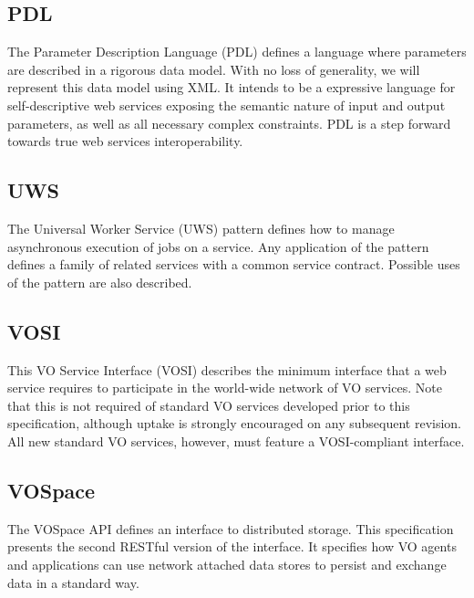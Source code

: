 \documentclass[11pt,a4paper]{ivoa}
\begin{document}
\subsection{PDL}

The Parameter Description Language (PDL) \citep{2014ivoa.spec.0523Z} defines a language where parameters are described in a 
rigorous data model. With no loss of generality, we will represent this data model using 
XML. It intends to be a expressive language for self-descriptive web services exposing 
the semantic nature of input and output parameters, as well as all necessary complex 
constraints. PDL is a step forward towards true web services interoperability. 
 
\subsection{UWS} 

The Universal Worker Service (UWS) \citep{2016ivoa.spec.1024H} pattern defines how to manage asynchronous execution 
of jobs on a service. Any application of the pattern defines a family of related services 
with a common service contract. Possible uses of the pattern are also described. 

\subsection{VOSI} 

This VO Service Interface (VOSI) \citep{2017ivoa.spec.0524G} describes the minimum interface that a web service requires to 
participate in the world-wide network of VO services. Note that this is not required of 
standard VO services developed prior to this specification, although uptake is strongly 
encouraged on any subsequent revision. All new standard VO services, however, must feature 
a VOSI-compliant interface. 

\subsection{VOSpace}

The VOSpace \citep{2018ivoa.spec.0621G} API defines an interface to distributed storage. This specification presents the 
second RESTful version of the interface. It specifies how VO agents and applications can 
use network attached data stores to persist and exchange data in a standard way. 


\end{document}
